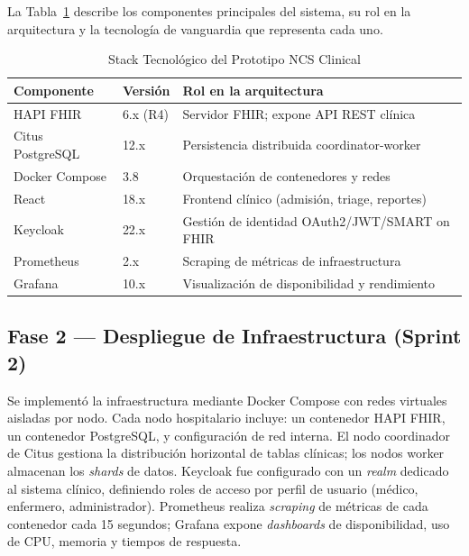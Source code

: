 \documentclass[conference]{IEEEtran}
\begin{document}
La Tabla~\ref{tab:componentes} describe los componentes principales
del sistema, su rol en la arquitectura y la tecnolog\'ia de vanguardia
que representa cada uno.

\begin{table}[htbp]
\caption{Stack Tecnol\'ogico del Prototipo NCS Clinical}
\label{tab:componentes}
\begin{center}
\renewcommand{\arraystretch}{1.2}
\begin{tabular}{|p{1.9cm}|p{1.5cm}|p{3.9cm}|}
\hline
\textbf{Componente} & \textbf{Versi\'on} & \textbf{Rol en la arquitectura} \\
\hline
HAPI FHIR & 6.x (R4) & Servidor FHIR; expone API REST cl\'inica \\
\hline
Citus PostgreSQL & 12.x & Persistencia distribuida coordinator-worker \\
\hline
Docker Compose & 3.8 & Orquestaci\'on de contenedores y redes \\
\hline
React & 18.x & Frontend cl\'inico (admisi\'on, triage, reportes) \\
\hline
Keycloak & 22.x & Gesti\'on de identidad OAuth2/JWT/SMART on FHIR \\
\hline
Prometheus & 2.x & Scraping de m\'etricas de infraestructura \\
\hline
Grafana & 10.x & Visualizaci\'on de disponibilidad y rendimiento \\
\hline
\end{tabular}
\end{center}
\end{table}

\subsection{Fase 2 --- Despliegue de Infraestructura (Sprint 2)}

Se implement\'o la infraestructura mediante Docker Compose con redes
virtuales aisladas por nodo. Cada nodo hospitalario incluye: un
contenedor HAPI FHIR, un contenedor PostgreSQL, y configuraci\'on de
red interna. El nodo coordinador de Citus gestiona la distribuci\'on
horizontal de tablas cl\'inicas; los nodos worker almacenan los
\textit{shards} de datos. Keycloak fue configurado con un \textit{realm}
dedicado al sistema cl\'inico, definiendo roles de acceso por perfil
de usuario (m\'edico, enfermero, administrador). Prometheus realiza
\textit{scraping} de m\'etricas de cada contenedor cada 15 segundos;
Grafana expone \textit{dashboards} de disponibilidad, uso de CPU,
memoria y tiempos de respuesta.
\end{document}
